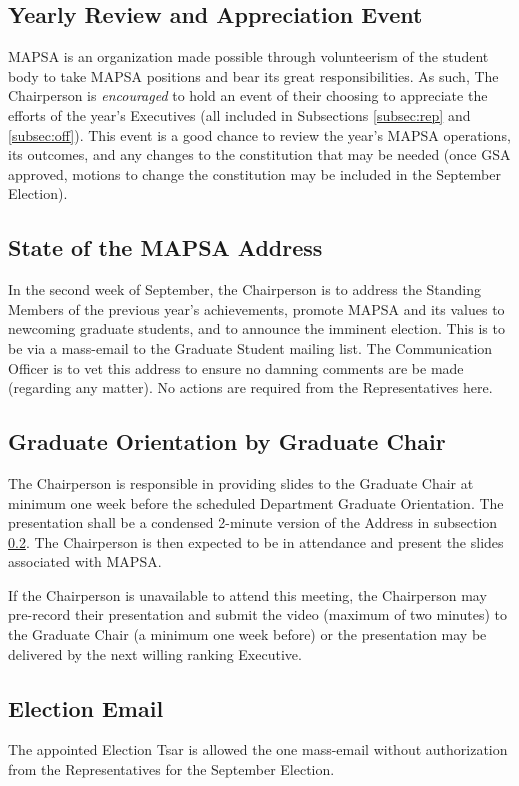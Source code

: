 \documentclass[8pt]{article}
\begin{document}
	\subsection{Yearly Review and Appreciation Event}\label{subsec:app}
	MAPSA is an organization made possible through volunteerism of the student body to take MAPSA positions and bear its great responsibilities. As such, The Chairperson is \textit{encouraged} to hold an event of their choosing to appreciate the efforts of the year's Executives (all included in Subsections \ref{subsec:rep} and \ref{subsec:off}). This event is a good chance to review the year's MAPSA operations, its outcomes, and any changes to the constitution that may be needed (once GSA approved, motions to change the constitution may be included in the September Election).

	\subsection{State of the MAPSA Address}\label{subsec:stateOfTheMAPSA}
	In the second week of September, the Chairperson is to address the Standing Members of the previous year's achievements, promote MAPSA and its values to newcoming graduate students, and to announce the imminent election. This is to be via a mass-email to the Graduate Student mailing list. The Communication Officer is to vet this address to ensure no damning comments are be made (regarding any matter). No actions are required from the Representatives here.
	
	\subsection{Graduate Orientation by Graduate Chair}\label{subsec:orient}
	The Chairperson is responsible in providing slides to the Graduate Chair at minimum one week before the scheduled Department Graduate Orientation. The presentation shall be a condensed 2-minute version of the Address in subsection \ref{subsec:stateOfTheMAPSA}. The Chairperson is then expected to be in attendance and present the slides associated with MAPSA.
	
	If the Chairperson is unavailable to attend this meeting, the Chairperson may pre-record their presentation and submit the video (maximum of two minutes) to the Graduate Chair (a minimum one week before) or the presentation may be delivered by the next willing ranking Executive. 
	
	\subsection{Election Email}\label{subsec:electionEmail}
	The appointed Election Tsar is allowed the one mass-email without authorization from the Representatives for the September Election. 
\end{document}
